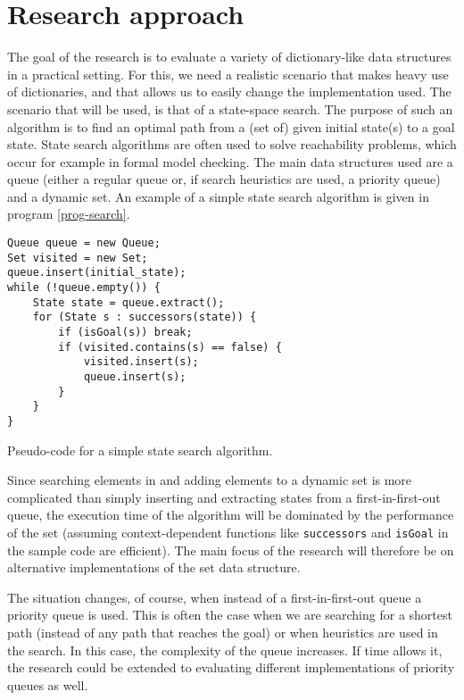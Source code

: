 \documentclass{acm_proc_article-sp}
\begin{document}
\section{Research approach}


The goal of the research is to evaluate a variety of dictionary-like data structures in a practical setting. For this, we need a realistic scenario that makes heavy use of dictionaries, and that allows us to easily change the implementation used. The scenario that will be used, is that of a state-space search. The purpose of such an algorithm is to find an optimal path from a (set of) given initial state(s) to a goal state. State search algorithms are often used to solve reachability problems, which occur for example in formal model checking. The main data structures used are a queue (either a regular queue or, if search heuristics are used, a priority queue) and a dynamic set. An example of a simple state search algorithm is given in program \ref{prog-search}.

\begin{program}
\begin{verbatim}
Queue queue = new Queue;
Set visited = new Set;
queue.insert(initial_state);
while (!queue.empty()) {
    State state = queue.extract();
    for (State s : successors(state)) {
        if (isGoal(s)) break;
        if (visited.contains(s) == false) {
            visited.insert(s);
            queue.insert(s);
        }
    }
}
\end{verbatim}
\caption{Pseudo-code for a simple state search algorithm.}
\label{prog-search}
\end{program}

Since searching elements in and adding elements to a dynamic set is more complicated than simply inserting and extracting states from a first-in-first-out queue, the execution time of the algorithm will be dominated by the performance of the set (assuming context-dependent functions like \verb#successors# and \verb#isGoal# in the sample code are efficient). The main focus of the research will therefore be on alternative implementations of the set data structure.

The situation changes, of course, when instead of a first-in-first-out queue a priority queue is used. This is often the case when we are searching for a shortest path (instead of any path that reaches the goal) or when heuristics are used in the search. In this case, the complexity of the queue increases. If time allows it, the research could be extended to evaluating different implementations of priority queues as well.
\end{document}
